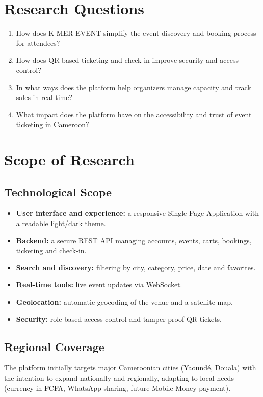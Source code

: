 \documentclass[12pt,a4paper]{report}
\begin{document}
\section{Research Questions}
\begin{enumerate}
  \item How does K-MER EVENT simplify the event discovery and booking process for attendees?
  \item How does QR-based ticketing and check-in improve security and access control?
  \item In what ways does the platform help organizers manage capacity and track sales in
        real time?
  \item What impact does the platform have on the accessibility and trust of event ticketing
        in Cameroon?
\end{enumerate}

\section{Scope of Research}
\subsection{Technological Scope}
\begin{itemize}
  \item \textbf{User interface and experience:} a responsive Single Page Application with a
        readable light/dark theme.
  \item \textbf{Backend:} a secure REST API managing accounts, events, carts, bookings,
        ticketing and check-in.
  \item \textbf{Search and discovery:} filtering by city, category, price, date and favorites.
  \item \textbf{Real-time tools:} live event updates via WebSocket.
  \item \textbf{Geolocation:} automatic geocoding of the venue and a satellite map.
  \item \textbf{Security:} role-based access control and tamper-proof QR tickets.
\end{itemize}

\subsection{Regional Coverage}
The platform initially targets major Cameroonian cities (Yaound\'e, Douala) with the
intention to expand nationally and regionally, adapting to local needs (currency in FCFA,
WhatsApp sharing, future Mobile Money payment).
\end{document}
